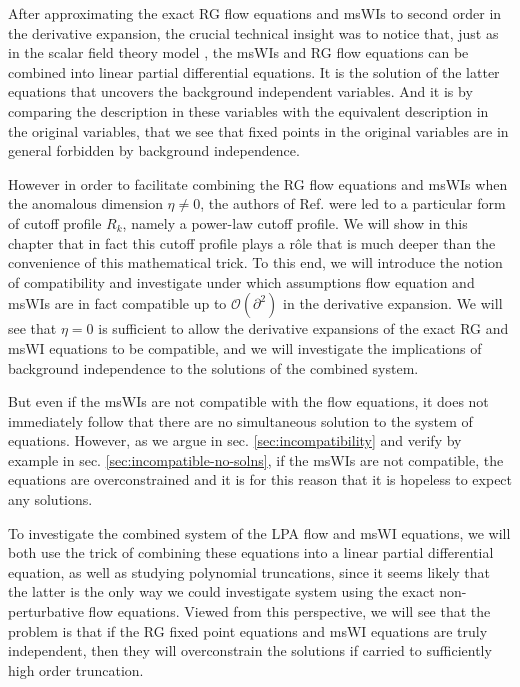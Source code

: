\documentclass[11pt]{book} %
\numberwithin{equation}{chapter}
\begin{document}
After approximating the exact RG flow equations and msWIs to second order in the derivative expansion,
the crucial technical insight was to notice that, just as in the scalar field theory model
\cite{Bridle:2013sra}, the msWIs and RG flow equations can be combined into linear partial
differential equations.
It is the solution of the latter equations that uncovers the background independent variables.
And it is by comparing the description in these variables with the equivalent description
in the original variables, that we see that fixed points in the original variables are
in general forbidden by background independence.

However in order to facilitate combining the RG flow equations and msWIs when the anomalous
dimension $\eta\ne0$, the authors of Ref. \cite{Dietz:2015owa} were led to a particular form
of cutoff profile $R_k$, namely a power-law cutoff profile.
We will show in this chapter that in fact this cutoff profile plays a r\^ole that is much
deeper than the convenience of this mathematical trick.
To this end, we will introduce the notion of compatibility and investigate under which
assumptions flow equation and msWIs are in fact compatible up to $\mathcal O(\partial^2)$
in the derivative expansion.
We will see that $\eta=0$ is sufficient to allow the derivative expansions of the exact RG and msWI equations
to be compatible, and we will investigate the implications of background independence to the solutions
of the combined system.

But even if the msWIs are not compatible with the flow equations,
it does not immediately follow that there are no simultaneous solution to the system of equations.
However, as we argue in sec. \ref{sec:incompatibility} and verify by example in
sec. \ref{sec:incompatible-no-solns},
if the msWIs are not compatible, the equations are overconstrained and it is for this reason that
it is hopeless to expect any solutions.

To investigate the combined system of the LPA flow and msWI equations,
we will both use the trick of combining these equations into a linear partial differential equation,
as well as studying polynomial truncations, since it seems likely that the latter is the only way we could
investigate system using the exact non-perturbative flow equations.
Viewed from this perspective, we will see that the problem is that if the RG fixed point equations
and msWI equations are truly independent, then they will overconstrain the solutions if
carried to sufficiently high order truncation.
\end{document}
